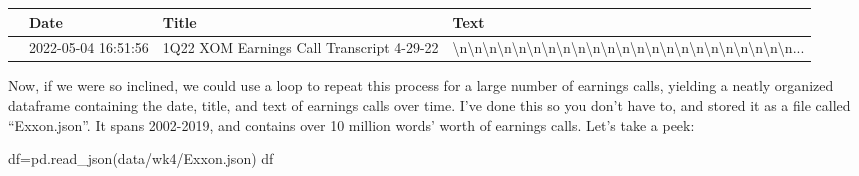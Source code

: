 \documentclass[
  letterpaper,
  DIV=11,
  numbers=noendperiod]{scrreprt}
\newenvironment{Shaded}{\begin{snugshade}}{\end{snugshade}}
\newcommand{\NormalTok}[1]{\textcolor[rgb]{0.00,0.23,0.31}{#1}}
\newcommand{\OperatorTok}[1]{\textcolor[rgb]{0.37,0.37,0.37}{#1}}
\newcommand{\StringTok}[1]{\textcolor[rgb]{0.13,0.47,0.30}{#1}}
\begin{document}
\begin{longtable}[]{@{}llll@{}}
\toprule\noalign{}
& Date & Title & Text \\
\midrule\noalign{}
\endhead
\bottomrule\noalign{}
\endlastfoot
0 & 2022-05-04 16:51:56 & 1Q22 XOM Earnings Call Transcript 4-29-22 &
\textbackslash n\textbackslash n\textbackslash n\textbackslash n\textbackslash n\textbackslash n\textbackslash n\textbackslash n\textbackslash n\textbackslash n\textbackslash n\textbackslash n\textbackslash n\textbackslash n\textbackslash n\textbackslash n\textbackslash n\textbackslash n\textbackslash n\textbackslash n\textbackslash n\textbackslash n\textbackslash n... \\
\end{longtable}

Now, if we were so inclined, we could use a loop to repeat this process
for a large number of earnings calls, yielding a neatly organized
dataframe containing the date, title, and text of earnings calls over
time. I've done this so you don't have to, and stored it as a file
called ``Exxon.json''. It spans 2002-2019, and contains over 10 million
words' worth of earnings calls. Let's take a peek:

\begin{Shaded}
\begin{Highlighting}[]
\NormalTok{df}\OperatorTok{=}\NormalTok{pd.read\_json(}\StringTok{\textquotesingle{}data/wk4/Exxon.json\textquotesingle{}}\NormalTok{)}
\NormalTok{df}
\end{Highlighting}
\end{Shaded}
\end{document}
